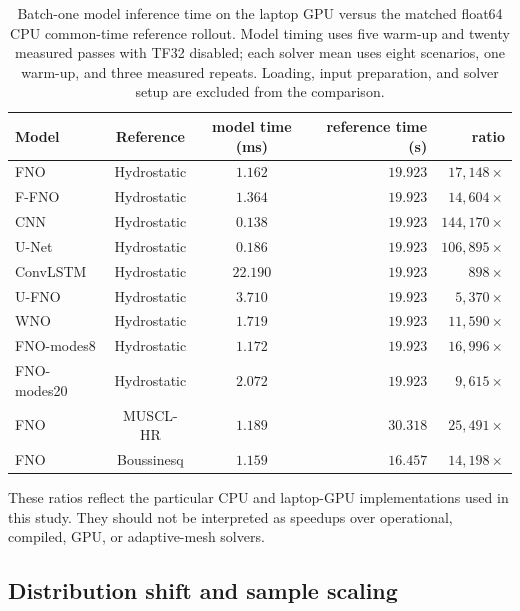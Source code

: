 \begin{table}[pos=!htbp]
\centering
\caption{Batch-one model inference time on the laptop GPU versus the matched float64 CPU common-time reference rollout. Model timing uses five warm-up and twenty measured passes with TF32 disabled; each solver mean uses eight scenarios, one warm-up, and three measured repeats. Loading, input preparation, and solver setup are excluded from the comparison.}
\label{tab:speed}
\small
\begin{tabular}{lccrr}
    \toprule
    Model & Reference & model time (ms) & reference time (s) & ratio \\
    \midrule
    FNO         & Hydrostatic & $1.162$ & $19.923$ & $17{,}148  \times$ \\
    F-FNO       & Hydrostatic & $1.364$ & $19.923$ & $14{,}604  \times$ \\
    CNN         & Hydrostatic & $0.138$ & $19.923$ & $144{,}170 \times$ \\
    U-Net       & Hydrostatic & $0.186$ & $19.923$ & $106{,}895 \times$ \\
    ConvLSTM    & Hydrostatic & $22.190$ & $19.923$ & $898      \times$ \\
    U-FNO       & Hydrostatic & $3.710$ & $19.923$ & $5{,}370   \times$ \\
    WNO         & Hydrostatic & $1.719$ & $19.923$ & $11{,}590  \times$ \\
    FNO-modes8  & Hydrostatic & $1.172$ & $19.923$ & $16{,}996  \times$ \\
    FNO-modes20 & Hydrostatic & $2.072$ & $19.923$ & $9{,}615   \times$ \\
    FNO         & MUSCL-HR    & $1.189$ & $30.318$ & $25{,}491  \times$ \\
    FNO         & Boussinesq  & $1.159$ & $16.457$ & $14{,}198  \times$ \\
    \bottomrule
\end{tabular}
\end{table}

These ratios reflect the particular CPU and laptop-GPU implementations used in this study. They should not be interpreted as speedups over operational, compiled, GPU, or adaptive-mesh solvers.

\FloatBarrier
\subsection{Distribution shift and sample scaling}
\label{subsec:res-ood}

